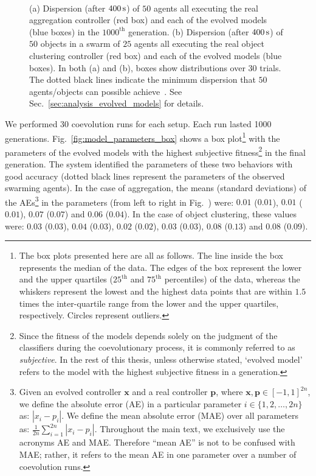 \begin{figure}[!t]
	\centering
		\\
		\caption{(a) Dispersion (after $\unit[400]{s}$) of $50$ agents all executing the real aggregation controller (red box) and each of the evolved models (blue boxes) in the $1000^\mathrm{th}$ generation. (b) Dispersion (after $\unit[400]{s}$) of $50$ objects in a swarm of $25$ agents all executing the real object clustering controller (red box) and each of the evolved models (blue boxes). In both (a) and (b), boxes show distributions over $30$ trials. The dotted black lines indicate the minimum dispersion that $50$ agents/objects can possible achieve~\cite{Graham1990}. See Sec.~\ref{sec:analysis_evolved_models} for details.\label{fig:model_validation_simulation}}
\end{figure}

We performed 30 coevolution runs for each setup. Each run lasted 1000 generations. Fig.~\ref{fig:model_parameters_box} shows a box plot\footnote{The box plots presented here are all as follows. The line inside the box represents the median of the data. The edges of the box represent the lower and the upper quartiles ($25^\mathrm{th}$ and $75^\mathrm{th}$ percentiles) of the data, whereas the whiskers represent the lowest and the highest data points that are within $1.5$ times the inter-quartile range from the lower and the upper quartiles, respectively. Circles represent outliers.\label{fn:boxplot}} with the parameters of the evolved models with the highest subjective fitness\footnote{Since the fitness of the models depends solely on the judgment of the classifiers during the coevolutionary process, it is commonly referred to as \textit{subjective}. In the rest of this thesis, unless otherwise stated, `evolved model' refers to the model with the highest subjective fitness in a generation.} in the final generation. The system identified the parameters of these two behaviors with good accuracy (dotted black lines represent the parameters of the observed swarming agents). In the case of aggregation, the means (standard deviations) of the AEs\footnote{Given an evolved controller $\mathbf{x}$ and a real controller $\mathbf{p}$, where $\mathbf{x},\mathbf{p}\in[-1,1]^{2n}$, we define the absolute error (AE) in a particular parameter $i\in\{1,2,\dots,2n\}$ as: $|x_i-p_i|$. We define the mean absolute error (MAE) over all parameters as: $\frac{1}{2n}\sum_{i=1}^{2n} |x_i-p_i|$. Throughout the main text, we exclusively use the acronyms AE and MAE. Therefore ``mean AE'' is not to be confused with MAE; rather, it refers to the mean AE in one parameter over a number of coevolution runs.} in the parameters (from left to right in Fig.~) were: $0.01$ ($0.01$), $0.01$ ($0.01$), $0.07$ ($0.07$) and $0.06$ ($0.04$). In the case of object clustering, these values were: $0.03$ ($0.03$), $0.04$ ($0.03$), $0.02$ ($0.02$), $0.03$ ($0.03$), $0.08$ ($0.13$) and $0.08$ ($0.09$).

